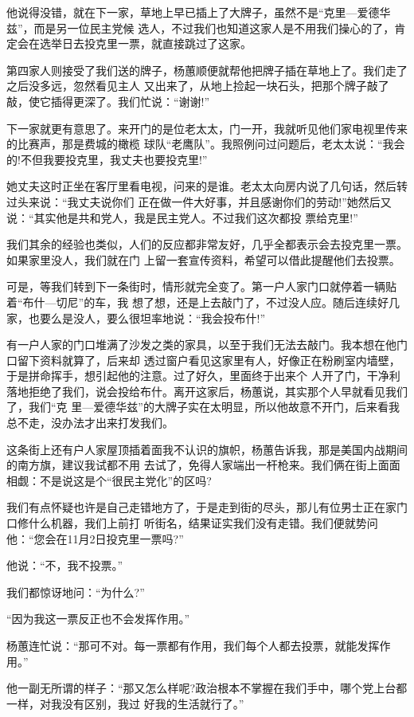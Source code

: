 ﻿\documentclass[11pt]{article}
\begin{document}
他说得没错，就在下一家，草地上早已插上了大牌子，虽然不是``克里---爱德华兹''，而是另一位民主党候
选人，不过我们也知道这家人是不用我们操心的了，肯定会在选举日去投克里一票，就直接跳过了这家。

第四家人则接受了我们送的牌子，杨蕙顺便就帮他把牌子插在草地上了。我们走了之后没多远，忽然看见主人
又出来了，从地上捡起一块石头，把那个牌子敲了敲，使它插得更深了。我们忙说：``谢谢!''

下一家就更有意思了。来开门的是位老太太，门一开，我就听见他们家电视里传来的比赛声，那是费城的橄榄
球队``老鹰队''。我照例问过问题后，老太太说：``我会的!不但我要投克里，我丈夫也要投克里!''

她丈夫这时正坐在客厅里看电视，问来的是谁。老太太向房内说了几句话，然后转过头来说：``我丈夫说你们
正在做一件大好事，并且感谢你们的劳动!''她然后又说：``其实他是共和党人，我是民主党人。不过我们这次都投
票给克里!''

我们其余的经验也类似，人们的反应都非常友好，几乎全都表示会去投克里一票。如果家里没人，我们就在门
上留一套宣传资料，希望可以借此提醒他们去投票。

可是，等我们转到下一条街时，情形就完全变了。第一户人家门口就停着一辆贴着``布什---切尼''的车，我
想了想，还是上去敲门了，不过没人应。随后连续好几家，也要么是没人，要么很坦率地说：``我会投布什!''

有一户人家的门口堆满了沙发之类的家具，以至于我们无法去敲门。我本想在他门口留下资料就算了，后来却
透过窗户看见这家里有人，好像正在粉刷室内墙壁，于是拼命挥手，想引起他的注意。过了好久，里面终于出来个
人开了门，干净利落地拒绝了我们，说会投给布什。离开这家后，杨蕙说，其实那个人早就看见我们了，我们``克
里---爱德华兹''的大牌子实在太明显，所以他故意不开门，后来看我总不走，没办法才出来打发我们。

这条街上还有户人家屋顶插着面我不认识的旗帜，杨蕙告诉我，那是美国内战期间的南方旗，建议我试都不用
去试了，免得人家端出一杆枪来。我们俩在街上面面相觑：不是说这是个``很民主党化''的区吗?

我们有点怀疑也许是自己走错地方了，于是走到街的尽头，那儿有位男士正在家门口修什么机器，我们上前打
听街名，结果证实我们没有走错。我们便就势问他：``您会在11月2日投克里一票吗?''

他说：``不，我不投票。''

我们都惊讶地问：``为什么?''

``因为我这一票反正也不会发挥作用。''

杨蕙连忙说：``那可不对。每一票都有作用，我们每个人都去投票，就能发挥作用。''

他一副无所谓的样子：``那又怎么样呢?政治根本不掌握在我们手中，哪个党上台都一样，对我没有区别，我过
好我的生活就行了。''
\end{document}
